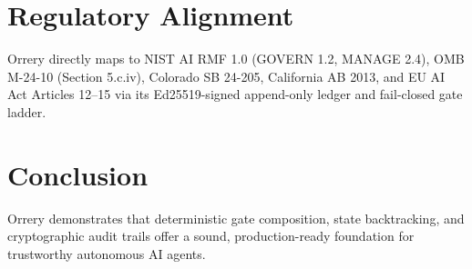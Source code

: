 \documentclass[11pt,a4paper]{article}
\begin{document}
\section{Regulatory Alignment}
Orrery directly maps to NIST AI RMF 1.0 (GOVERN 1.2, MANAGE 2.4), OMB M-24-10 (Section 5.c.iv), Colorado SB 24-205, California AB 2013, and EU AI Act Articles 12--15 via its Ed25519-signed append-only ledger and fail-closed gate ladder.

\section{Conclusion}
Orrery demonstrates that deterministic gate composition, state backtracking, and cryptographic audit trails offer a sound, production-ready foundation for trustworthy autonomous AI agents.
\end{document}
